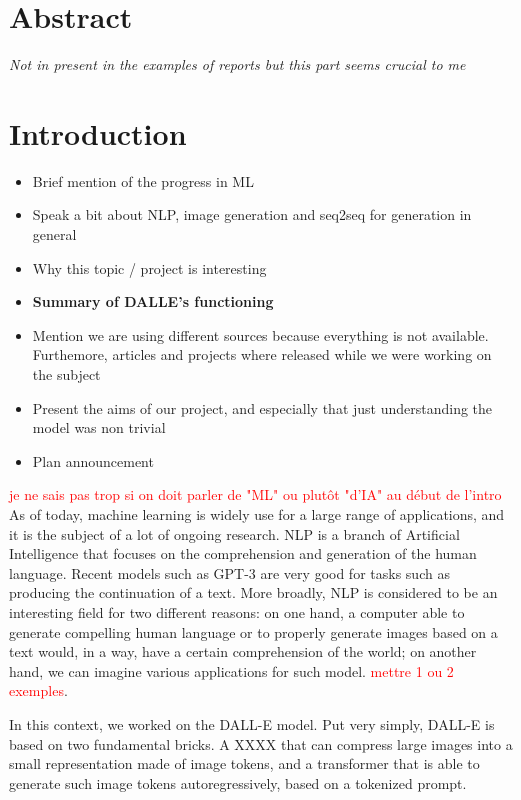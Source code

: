 \documentclass{article}
\begin{document}
\pagebreak
\section{Abstract}
\textit{Not in present in the examples of reports but this part seems crucial to me}

\pagebreak
\section{Introduction}

\begin{itemize}
    \item Brief mention of the progress in ML
    \item Speak a bit about NLP, image generation and seq2seq for generation in general
    \item Why this topic / project is interesting
    \item \textbf{Summary of DALLE's functioning}
    \item Mention we are using different sources because everything is not available. Furthemore, articles and projects where released while we were working on the subject
    \item Present the aims of our project, and especially that just understanding the model was non trivial
    \item Plan announcement
\end{itemize}

\textcolor{red}{je ne sais pas trop si on doit parler de "ML" ou plutôt "d'IA" au début de l'intro}
As of today, machine learning is widely use for a large range of applications, and it is the subject of a lot of ongoing research. NLP is a branch of Artificial Intelligence that focuses on the comprehension and generation of the human language. Recent models such as GPT-3 are very good for tasks such as producing the continuation of a text. More broadly, NLP is considered to be an interesting field for two different reasons: on one hand, a computer able to generate compelling human language or to properly generate images based on a text would, in a way, have a certain comprehension of the world; on another hand, we can imagine various applications for such model. \textcolor{red}{mettre 1 ou 2 exemples}.

In this context, we worked on the DALL-E model. Put very simply, DALL-E is based on two fundamental bricks. A XXXX that can compress large images into a small representation made of image tokens, and a transformer that is able to generate such image tokens autoregressively, based on a tokenized prompt. 
\end{document}

